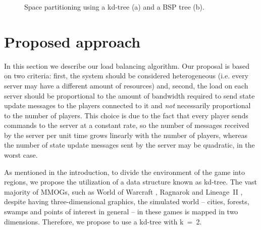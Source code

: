\documentclass[acmjacm]{acmtrans2m}
\begin{document}
\begin{figure}[!t]
	\centering
	\caption{Space partitioning using a kd-tree (a) and a BSP tree (b).}
	\label{fig:bsp}
\end{figure}

\section{Proposed approach}
\label{sec:proposal}

In this section we describe our load balancing algorithm. Our proposal is based on two criteria: first, the system should be considered heterogeneous (i.e. every server may have a different amount of resources) and, second, the load on each server should be proportional to the amount of bandwidth required to send state update messages to the players connected to it and \emph{not} necessarily proportional to the number of players. This choice is due to the fact that every player sends commands to the server at a constant rate, so the number of messages received by the server per unit time grows linearly with the number of players, whereas the number of state update messages sent by the server may be quadratic, in the worst case.

As mentioned in the introduction, to divide the environment of the game into regions, we propose the utilization of a data structure known as kd-tree. The vast majority of MMOGs, such as World of Warcraft \cite{worldofwarcraft}, Ragnarok \cite{ragnarok} and \mbox{Lineage II} \cite{lineage2}, despite having three-dimensional graphics, the simulated world -- cities, forests, swamps and points of interest in general -- in these games is mapped in two dimensions. Therefore, we propose to use a kd-tree with \mbox{k = 2}.
\end{document}
